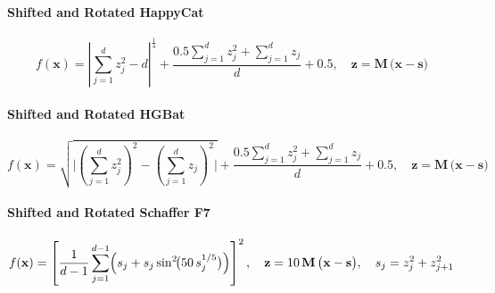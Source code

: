 \vspace{.095em}
\paragraph{Shifted and Rotated HappyCat}
\begin{equation}
f(\mathbf{x})
= \left\lvert\sum_{j=1}^d z_j^2 - d\right\rvert^{\tfrac14}
+ \frac{0.5\sum_{j=1}^d z_j^2 + \sum_{j=1}^d z_j}{d}
+ 0.5,
\quad \mathbf{z} = \mathbf{M}\,\bigl(\mathbf{x}-\mathbf{s}\bigr)
\label{ben:ShiftedRotatedHappyCat}
\end{equation}

\vspace{.095em}
\paragraph{Shifted and Rotated HGBat}
\begin{equation}
f(\mathbf{x})
= \sqrt{\bigl\lvert(\sum_{j=1}^d z_j^2)^2 - (\sum_{j=1}^d z_j)^2\bigr\rvert}
+ \frac{0.5\sum_{j=1}^d z_j^2 + \sum_{j=1}^d z_j}{d}
+ 0.5,
\quad \mathbf{z} = \mathbf{M}\,\bigl(\mathbf{x}-\mathbf{s}\bigr)
\label{ben:ShiftedRotatedHGBat}
\end{equation}

\vspace{.095em}
\paragraph{Shifted and Rotated Schaffer F7}
\begin{equation}
f(\mathbf{x})
= \left[\frac{1}{d-1}\sum_{j=1}^{d-1}\Bigl(s_j + s_j\sin^2\!\bigl(50\,s_j^{1/5}\bigr)\Bigr)\right]^2,
\quad \mathbf{z} = 10\,\mathbf{M}\,\bigl(\mathbf{x}-\mathbf{s}\bigr),
\quad s_j = z_j^2 + z_{j+1}^2
\label{ben:ShiftedRotatedSchafferF7}
\end{equation}


